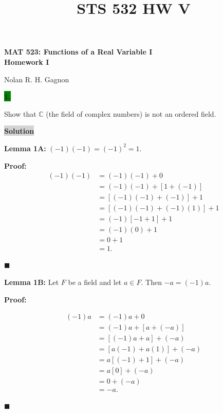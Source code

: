 \documentclass[12pt]{article}
\title{STS 532 HW V}
\newcommand{\mybox}{%
    \collectbox{%
        \setlength{\fboxsep}{2pt}%
        \fbox{\BOXCONTENT}%
    }%
}
\begin{document}
\begin{center}
\begin{large}
\textbf{MAT 523: Functions of a Real Variable I \\
Homework I \\}
\end{large}
Nolan R. H. Gagnon \\
\end{center}

\noindent\mybox{\colorbox{green}{\textbf{ 1. }}}\hspace{3mm}\hrulefill

\noindent Show that $\mathbb{C}$ (the field of complex numbers) is not an ordered field.

\vspace{5mm}

\noindent\mybox{\colorbox{lightgray}{\textbf{Solution}}}\hspace{3mm}\hrulefill


\noindent\textbf{Lemma 1A:}
\noindent $(-1)(-1)=(-1)^2 = 1.$

\noindent\textbf{Proof:}
\begin{align*}
(-1)(-1) &= (-1)(-1) + 0 \\
&= (-1)(-1)+[1 + (-1)] \\
&= [(-1)(-1)+(-1)] + 1\\
&= [(-1)(-1)+(-1)(1)] + 1 \\
&= (-1)[-1+1]+1 \\
&= (-1)(0) + 1 \\
&= 0 + 1\\
&= 1.
\end{align*}

\hfill$\blacksquare$

\noindent\textbf{Lemma 1B:} Let $F$ be a field and let $a\in F$. Then $-a = (-1)a$.

\noindent\textbf{Proof:} 

\begin{align*}
(-1)a &= (-1)a + 0 \\
&= (-1)a + [a+(-a)] \\
&= [(-1)a+a]+(-a) \\
&= [a(-1)+a(1)] + (-a) \\
&= a[(-1) + 1] + (-a) \\
&= a[0] + (-a) \\
&= 0 + (-a) \\
&= -a.
\end{align*}

\hfill$\blacksquare$
\end{document}
